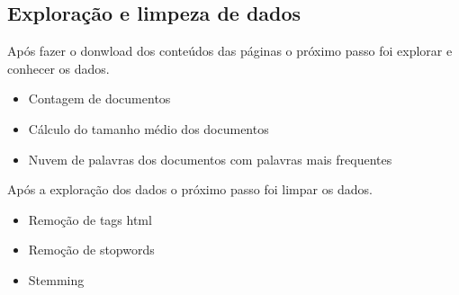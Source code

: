 \subsection{{Exploração e limpeza de dados}}

Após fazer o donwload dos conteúdos das páginas o próximo passo foi explorar e conhecer os dados.

\begin{itemize}
    \item Contagem de documentos
    \item Cálculo do tamanho médio dos documentos
    \item Nuvem de palavras dos documentos com palavras mais frequentes
\end{itemize}

Após a exploração dos dados o próximo passo foi limpar os dados.

\begin{itemize}
    \item Remoção de tags html
    \item Remoção de stopwords
    \item Stemming
\end{itemize}